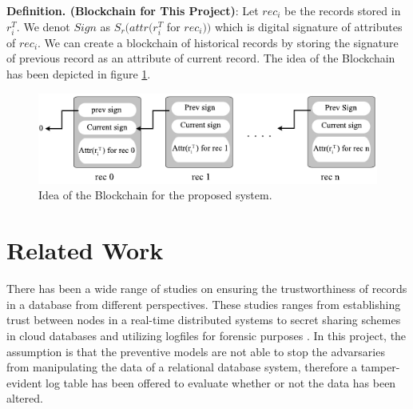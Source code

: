 \textbf{Definition. (Blockchain for This Project)}: Let $rec_i$ be the records stored in $r_i^T$. We denot $Sign$ as $S_r(attr(r_i^T$ for $rec_i))$ which is digital signature of attributes of $rec_i$. We can create a blockchain of historical records by storing the signature of previous record as an attribute of current record. The idea of the Blockchain has been depicted in figure \ref{fig:Blockchain}.

\begin{figure}
	\label{fig:Blockchain}
	\centering
	\includegraphics[width=\textwidth]{figs/blockchain.pdf}
	\caption{Idea of the Blockchain for the proposed system.}
\end{figure}

\section {Related Work}
There has been a wide range of studies on ensuring the trustworthiness of records in a database from different perspectives. These studies ranges from establishing trust between nodes in a real-time distributed systems \cite{khayat2017trust} to secret sharing schemes in cloud databases \cite{dutta2013privacy} and utilizing logfiles for forensic purposes \cite{sinha2014continuous}. In this project, the assumption is that the preventive models are not able to stop the advarsaries from manipulating the data of a relational database system, therefore a tamper-evident log table has been offered to evaluate whether or not the data has been altered. 


